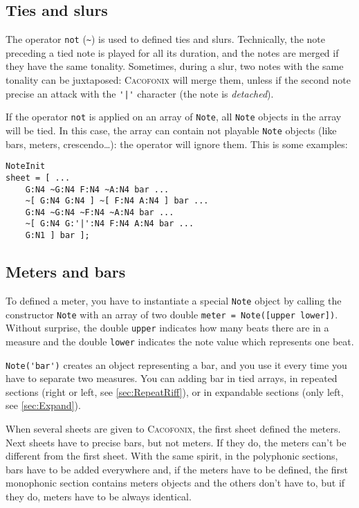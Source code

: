\documentclass{article}
\newcommand\cacofonix{\textsc{Cacofonix}\xspace}
\newcommand\note{\lstinline!Note!\xspace}
\begin{document}
\subsection{Ties and slurs}
\label{sec:TiesAndSlurs}

The operator \lstinline!not! (\lstinline!~!) is used to defined ties and slurs. Technically, the note preceding a tied note is played for all its duration, and the notes are merged if they have the same tonality. Sometimes, during a slur, two notes with the same tonality can be juxtaposed: \cacofonix will merge them, unless if the second note precise an attack with the \lstinline!'|'! character (the note is \emph{detached}).

If the operator \lstinline!not! is applied on an array of \note, all \note objects in the array will be tied. In this case, the array can contain not playable \note objects (like bars, meters, crescendo\dots): the operator will ignore them. This is some examples: \\

\begin{lstlisting}
NoteInit
sheet = [ ...
	G:N4 ~G:N4 F:N4 ~A:N4 bar ...
	~[ G:N4 G:N4 ] ~[ F:N4 A:N4 ] bar ...
	G:N4 ~G:N4 ~F:N4 ~A:N4 bar ...
	~[ G:N4 G:'|':N4 F:N4 A:N4 bar ...
	G:N1 ] bar ];
\end{lstlisting}

\subsection{Meters and bars}

To defined a meter, you have to instantiate a special \note object by calling the constructor \lstinline!Note! with an array of two double \lstinline!meter = Note([upper lower])!. Without surprise, the double \lstinline!upper! indicates how many beats there are in a measure and the double \lstinline!lower! indicates the note value which represents one beat.

\lstinline!Note('bar')! creates an object representing a bar, and you use it every time you have to separate two measures. You can adding bar in tied arrays, in repeated sections (right or left, see \ref{sec:RepeatRiff}), or in expandable sections (only left, see \ref{sec:Expand}).

When several sheets are given to \cacofonix, the first sheet defined the meters. Next sheets have to precise bars, but not meters. If they do, the meters can't be different from the first sheet. With the same spirit, in the polyphonic sections, bars have to be added everywhere and, if the meters have to be defined, the first monophonic section contains meters objects and the others don't have to, but if they do, meters have to be always identical.
\end{document}
